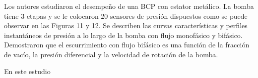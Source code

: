 \textcite{Olivet2002}

Los autores  estudiaron el desempeño de una BCP con estator metálico. La bomba tiene 3 etapas y se le colocaron 20 sensores de presión dispuestos como se puede observar en las Figuras 11 y 12. Se describen las curvas características y perfiles instantáneos de presión a lo largo de la bomba con flujo monofásico y bifásico. \citeauthor{Olivet2002} Demostraron que el escurrimiento con flujo bifásico es una función de la fracción de vacío, la presión diferencial y la velocidad de rotación de la bomba.

En este estudio 











